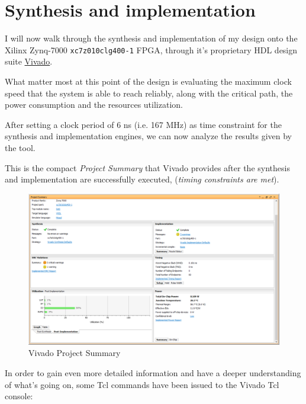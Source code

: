 \documentclass[12pt, a4paper]{article}
\begin{document}
\section{Synthesis and implementation}

I will now walk through the synthesis and implementation of my design onto the Xilinx Zynq-7000 \texttt{xc7z010clg400-1} FPGA, through it's proprietary HDL design suite \href{https://www.xilinx.com/products/design-tools/vivado.html}{Vivado}.
\newline

What matter most at this point of the design is evaluating the maximum clock speed that the system is able to reach reliably, along with the critical path, the power consumption and the resources utilization.

After setting a clock period of 6 ns (i.e. 167 MHz) as time constraint for the synthesis and implementation engines, we can now analyze the results given by the tool.
\newline

This is the compact \textit{Project Summary} that Vivado provides after the synthesis and implementation are successfully executed, (\textit{timing constraints are met}).






\begin{figure}[h!]
\centering
\includegraphics[scale=0.4]{../screenshots/vivado/project_summary.png}
\caption{Vivado Project Summary}%
\end{figure}



\bigskip
\bigskip
In order to gain even more detailed information and have a deeper understanding of what's going on, some Tcl commands have been issued to the Vivado Tcl console:
\newline
\end{document}
